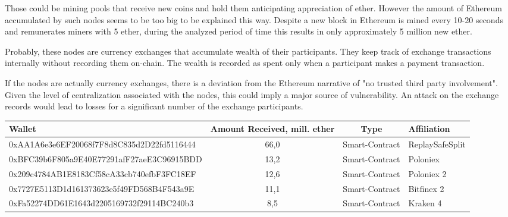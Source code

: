 Those could be mining pools that receive new coins and hold them anticipating appreciation of ether.
However the amount of Ethereum accumulated by such nodes seems to be too big to be explained this way.
Despite a new block in Ethereum is mined every 10-20 seconds and remunerates miners with 5 ether, during the analyzed period of time this results in only approximately 5 million new ether.

Probably, these nodes are currency exchanges that accumulate wealth of their participants. 
They keep track of exchange transactions internally without recording them on-chain. 
The wealth is recorded as spent only when a participant makes a payment transaction.

If the nodes are actually currency exchanges, there is a deviation from the Ethereum narrative of "no trusted third party involvement".
Given the level of centralization associated with the nodes, this could imply a major source of vulnerability.
An attack on the exchange records would lead to losses for a significant number of the exchange participants.

\begin{table}
\centering
{} 
\label{tab:t5mr} 
\begin{adjustbox}{width=0.9\linewidth}
\begin{tabular}{lccl}
  \hline
Wallet & Amount Received, mill. ether & Type & Affiliation \\
  \hline
  0xAA1A6e3e6EF20068f7F8d8C835d2D22fd5116444 & 66,0 & Smart-Contract & ReplaySafeSplit \\ 
  0xBFC39b6F805a9E40E77291afF27aeE3C96915BDD & 13,2 & Smart-Contract & Poloniex \\ 
  0x209c4784AB1E8183Cf58cA33cb740efbF3FC18EF & 12,6 & Smart-Contract & Poloniex 2 \\ 
  0x7727E5113D1d161373623e5f49FD568B4F543a9E & 11,1 & Smart-Contract & Bitfinex 2 \\ 
  0xFa52274DD61E1643d2205169732f29114BC240b3 & 8,5 & Smart-Contract & Kraken 4 \\ 
   \hline
\end{tabular}
\end{adjustbox}
\end{table}

